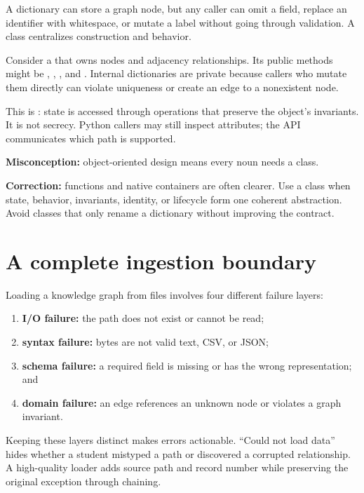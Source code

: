 A dictionary can store a graph node, but any caller can omit a field, replace an
identifier with whitespace, or mutate a label without going through validation.
A class centralizes construction and behavior.

Consider a  that owns nodes and adjacency relationships.
Its public methods might be , ,
, and . Internal dictionaries are private
because callers who mutate them directly can violate uniqueness or create an
edge to a nonexistent node.

This is : state is accessed through operations that preserve
the object's invariants. It is not secrecy. Python callers may still inspect
attributes; the API communicates which path is supported.

\begin{misconceptionbox}
\textbf{Misconception:} object-oriented design means every noun needs a class.

\textbf{Correction:} functions and native containers are often clearer. Use a
class when state, behavior, invariants, identity, or lifecycle form one coherent
abstraction. Avoid classes that only rename a dictionary without improving the
contract.
\end{misconceptionbox}

\section{A complete ingestion boundary}

Loading a knowledge graph from files involves four different failure layers:

\begin{enumerate}
  \item \textbf{I/O failure:} the path does not exist or cannot be read;
  \item \textbf{syntax failure:} bytes are not valid text, CSV, or JSON;
  \item \textbf{schema failure:} a required field is missing or has the wrong
  representation; and
  \item \textbf{domain failure:} an edge references an unknown node or violates
  a graph invariant.
\end{enumerate}

Keeping these layers distinct makes errors actionable. ``Could not load data''
hides whether a student mistyped a path or discovered a corrupted relationship.
A high-quality loader adds source path and record number while preserving the
original exception through chaining.


